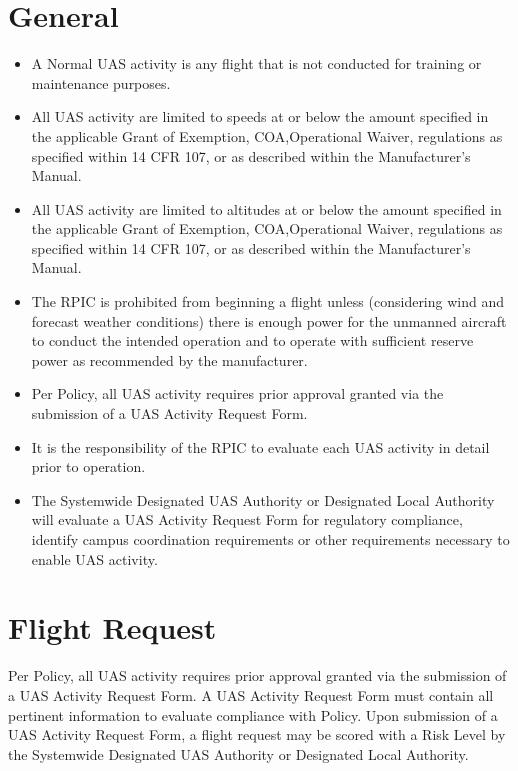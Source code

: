 \documentclass[
]{book}
\providecommand{\tightlist}{%
  \setlength{\itemsep}{0pt}\setlength{\parskip}{0pt}}
\begin{document}
\hypertarget{general}{%
\section{General}\label{general}}

\begin{itemize}
\tightlist
\item
  A Normal UAS activity is any flight that is not conducted for training or maintenance purposes.
\item
  All UAS activity are limited to speeds at or below the amount specified in the applicable Grant of Exemption, COA,Operational Waiver, regulations as specified within 14 CFR 107, or as described within the Manufacturer's Manual.
\item
  All UAS activity are limited to altitudes at or below the amount specified in the applicable Grant of Exemption, COA,Operational Waiver, regulations as specified within 14 CFR 107, or as described within the Manufacturer's Manual.
\item
  The RPIC is prohibited from beginning a flight unless (considering wind and forecast weather conditions) there is enough power for the unmanned aircraft to conduct the intended operation and to operate with sufficient reserve power as recommended by the manufacturer.
\item
  Per Policy, all UAS activity requires prior approval granted via the submission of a UAS Activity Request Form.
\item
  It is the responsibility of the RPIC to evaluate each UAS activity in detail prior to operation.
\item
  The Systemwide Designated UAS Authority or Designated Local Authority will evaluate a UAS Activity Request Form for regulatory compliance, identify campus coordination requirements or other requirements necessary to enable UAS activity.
\end{itemize}

\hypertarget{flight-request}{%
\section{Flight Request}\label{flight-request}}

Per Policy, all UAS activity requires prior approval granted via the submission of a UAS Activity Request Form. A UAS Activity Request Form must contain all pertinent information to evaluate compliance with Policy. Upon submission of a UAS Activity Request Form, a flight request may be scored with a Risk Level by the Systemwide Designated UAS Authority or Designated Local Authority.
\end{document}
